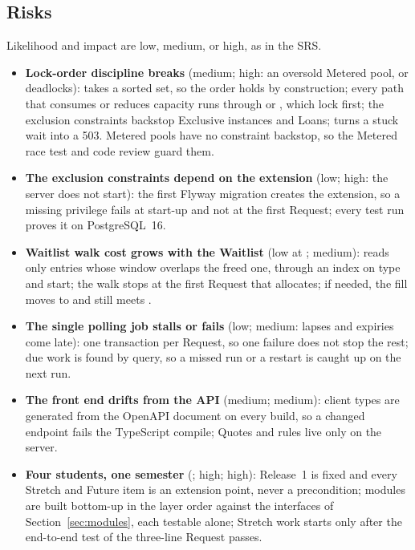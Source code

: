 \subsection{Risks}

Likelihood and impact are low, medium, or high, as in the SRS.
\begin{itemize}
  \item \textbf{Lock-order discipline breaks} (medium; high: an oversold Metered pool, or deadlocks):  takes a sorted set, so the order holds by construction; every path that consumes or reduces capacity runs through  or , which lock first; the exclusion constraints backstop Exclusive instances and Loans;  turns a stuck wait into a 503. Metered pools have no constraint backstop, so the Metered race test and code review guard them.
  \item \textbf{The exclusion constraints depend on the  extension} (low; high: the server does not start): the first Flyway migration creates the extension, so a missing privilege fails at start-up and not at the first Request; every test run proves it on PostgreSQL~16.
  \item \textbf{Waitlist walk cost grows with the Waitlist} (low at ; medium):  reads only entries whose window overlaps the freed one, through an index on type and start; the walk stops at the first Request that allocates; if needed, the fill moves to  and still meets .
  \item \textbf{The single polling job stalls or fails} (low; medium: lapses and expiries come late): one transaction per Request, so one failure does not stop the rest; due work is found by query, so a missed run or a restart is caught up on the next run.
  \item \textbf{The front end drifts from the API} (medium; medium): client types are generated from the OpenAPI document on every build, so a changed endpoint fails the TypeScript compile; Quotes and rules live only on the server.
  \item \textbf{Four students, one semester} (; high; high): Release~1 is fixed and every Stretch and Future item is an extension point, never a precondition; modules are built bottom-up in the layer order against the interfaces of Section~\ref{sec:modules}, each testable alone; Stretch work starts only after the end-to-end test of the three-line Request passes.
\end{itemize}
